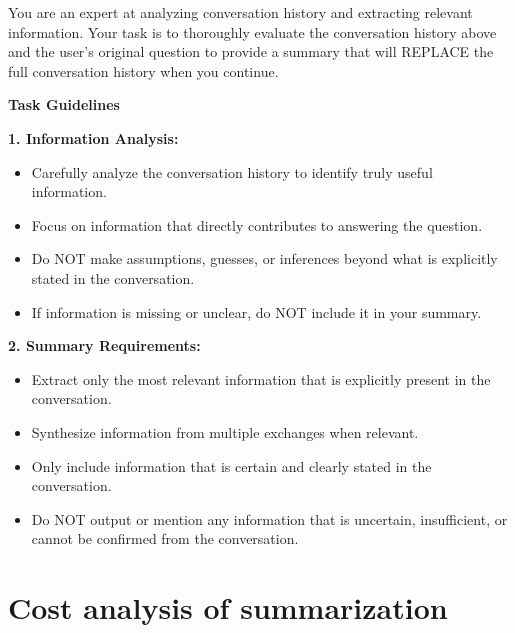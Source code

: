 \documentclass{article}
\begin{document}
  \begin{tcolorbox}[
  colback=teal!5,
  colframe=teal!70!black,
  coltitle=white,
  title={\textbf{Summarizer prompt} ($\mathcal{S}$ instruction appended to $(x, y_{1:t})$)},
  label=box:summ,
  fonttitle=\small,
  boxrule=0.5pt,
  arc=2pt,        %
  left=6pt, right=6pt  %
  ]
  \small
You are an expert at analyzing conversation history and extracting relevant information. Your task is to thoroughly evaluate the conversation history above and the user's original question to provide a summary that will REPLACE the full conversation history when you continue.

  \medskip
  \textbf{Task Guidelines}

  \textbf{1. Information Analysis:}
  \begin{itemize}\setlength\itemsep{0pt}\setlength\topsep{0pt}
  \item Carefully analyze the conversation history to identify truly useful information.
  \item Focus on information that directly contributes to answering the question.
  \item Do NOT make assumptions, guesses, or inferences beyond what is explicitly stated in the conversation.
  \item If information is missing or unclear, do NOT include it in your summary.
  \end{itemize}

  \textbf{2. Summary Requirements:}
  \begin{itemize}\setlength\itemsep{0pt}\setlength\topsep{0pt}
  \item Extract only the most relevant information that is explicitly present in the conversation.
  \item Synthesize information from multiple exchanges when relevant.
  \item Only include information that is certain and clearly stated in the conversation.
  \item Do NOT output or mention any information that is uncertain, insufficient, or cannot be confirmed from the conversation.
  \end{itemize}
  \end{tcolorbox}


\clearpage

\section{Cost analysis of summarization}
\label{appendix:cost}
\end{document}
